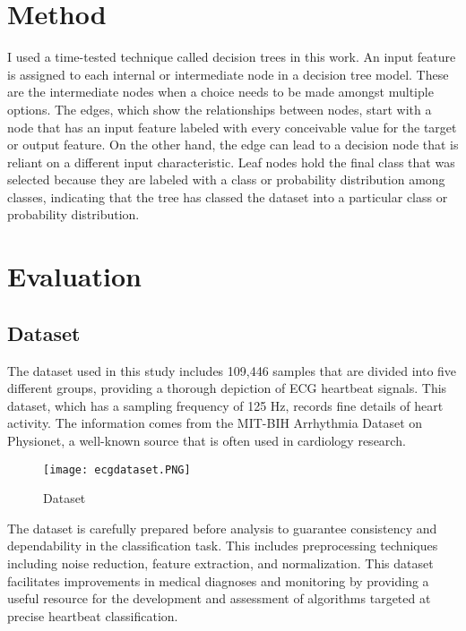 \documentclass{article}
\begin{document}
\begin{multicols}{2}
\section{Method}
I used a time-tested technique called decision trees in this work. An input feature is assigned to each internal or intermediate node in a decision tree model. These are the intermediate nodes when a choice needs to be made amongst multiple options. The edges, which show the relationships between nodes, start with a node that has an input feature labeled with every conceivable value for the target or output feature. On the other hand, the edge can lead to a decision node that is reliant on a different input characteristic. Leaf nodes hold the final class that was selected because they are labeled with a class or probability distribution among classes, indicating that the tree has classed the dataset into a particular class or probability distribution.








\section{Evaluation}

\subsection{Dataset}

The dataset used in this study includes 109,446 samples that are divided into five different groups, providing a thorough depiction of ECG heartbeat signals. This dataset, which has a sampling frequency of 125 Hz, records fine details of heart activity. The information comes from the MIT-BIH Arrhythmia Dataset on Physionet, a well-known source that is often used in cardiology research.

\begin{figure}[H]
    \centering
    \texttt{[image: ecgdataset.PNG]}
    \caption{Dataset}
    \label{fig:ecgdataset.PNG}
\end{figure}
The dataset is carefully prepared before analysis to guarantee consistency and dependability in the classification task. This includes preprocessing techniques including noise reduction, feature extraction, and normalization. This dataset facilitates improvements in medical diagnoses and monitoring by providing a useful resource for the development and assessment of algorithms targeted at precise heartbeat classification.


\end{multicols}
\end{document}
